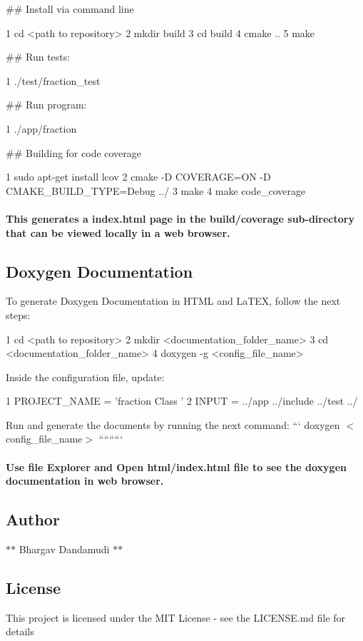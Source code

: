 \#\# Install via command line 
\begin{DoxyCode}
1 cd <path to repository>
2 mkdir build
3 cd build
4 cmake ..
5 make
\end{DoxyCode}
 \#\# Run tests\+: 
\begin{DoxyCode}
1 ./test/fraction\_test
\end{DoxyCode}
 \#\# Run program\+: 
\begin{DoxyCode}
1 ./app/fraction 
\end{DoxyCode}
 \#\# Building for code coverage 
\begin{DoxyCode}
1 sudo apt-get install lcov
2 cmake -D COVERAGE=ON -D CMAKE\_BUILD\_TYPE=Debug ../
3 make
4 make code\_coverage
\end{DoxyCode}
 \paragraph*{This generates a index.\+html page in the build/coverage sub-\/directory that can be viewed locally in a web browser.}

\subsection*{Doxygen Documentation}

To generate Doxygen Documentation in H\+T\+ML and La\+T\+EX, follow the next steps\+: 
\begin{DoxyCode}
1 cd <path to repository>
2 mkdir <documentation\_folder\_name>
3 cd <documentation\_folder\_name>
4 doxygen -g <config\_file\_name>
\end{DoxyCode}
 Inside the configuration file, update\+: 
\begin{DoxyCode}
1 PROJECT\_NAME = 'fraction Class '
2 INPUT = ../app ../include ../test ../
\end{DoxyCode}
 Run and generate the documents by running the next command\+: ``` doxygen $<$config\+\_\+file\+\_\+name$>$ ````````` \paragraph*{Use file Explorer and Open html/index.\+html file to see the doxygen documentation in web browser.}

\subsection*{Author}


\begin{DoxyItemize}
\item $\ast$$\ast$ Bhargav Dandamudi $\ast$$\ast$
\end{DoxyItemize}

\subsection*{License}

This project is licensed under the M\+IT License -\/ see the L\+I\+C\+E\+N\+SE.md file for details 